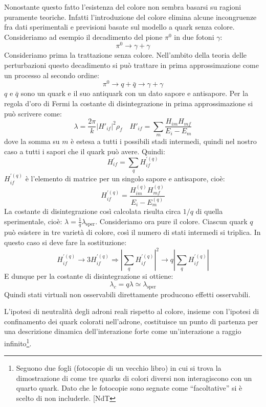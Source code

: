 Nonostante questo fatto l'esistenza del colore non sembra basarsi su ragioni puramente teoriche.
Infatti l'introduzione del colore elimina alcune incongruenze fra dati sperimentali e previsioni basate sul
modello a quark senza colore.
Consideriamo ad esempio il decadimento del pione $\pi^0$ in due fotoni $\gamma$:
\[
\pi^0\rightarrow\gamma+\gamma
\]
Consideriamo prima la trattazione senza colore. Nell'ambito della teoria delle perturbazioni questo decadimento
si può trattare in prima approssimazione come un processo al secondo ordine:
\begin{equation}
\pi^0\rightarrow q+\bar{q}\rightarrow\gamma+\gamma
\end{equation}
$q$ e $\bar{q}$ sono un quark e il suo antiquark con un dato sapore e antisapore. Per la regola d'oro di Fermi la
costante di disintegrazione in prima approssimazione si può scrivere come:
\begin{equation}
\lambda=\frac{2\pi}{k}|H'_{if}|^2\rho_f\quad H'_{if}=\sum_m\frac{H_{im}H_{mf}}{E_i-E_m}
\end{equation}
dove la somma su $m$ è estesa a tutti i possibili stadi intermedi, quindi nel nostro caso a tutti i sapori che
il quark può avere. Quindi:
\[
H_{if}^{'}=\sum_q H_{if}^{'(q)}
\]
$H_{if}^{'(q)}$ è l'elemento di matrice per un singolo sapore e antisapore, cioè:
\[
H_{if}^{'(q)}=\frac{H_{im}^{(q)}H_{mf}^{(q)}}{E_i-E_m^{(q)}}
\]
La costante di disintegrazione così calcolata risulta circa $1/q$ di quella sperimentale,
cioè: $\lambda=\frac{1}{q}\lambda_{\text{sper}}$.
Consideriamo ora pure il colore. Ciascun quark $q$ può esistere in tre varietà di colore, così il numero di
stati intermedi si triplica. In questo caso si deve fare la sostituzione:
\[
H_{if}^{'(q)}\rightarrow 3H_{if}^{'(q)}\Rightarrow |\sum_q H_{if}^{'(q)}|^2\rightarrow q|\sum_q H_{if}^{'(q)}|
\]
E dunque per la costante di disintegrazione si ottiene:
\[
\lambda_c=q\lambda\simeq\lambda_{\text{sper}}
\]
Quindi stati virtuali non osservabili direttamente producono effetti osservabili.

L'ipotesi di neutralità degli adroni reali rispetto al colore, insieme con
l'ipotesi di confinamento dei quark colorati nell'adrone, costituisce un punto
di partenza per una descrizione dinamica dell'interazione forte come
un'interazione a raggio infinito\footnote{Seguono due fogli (fotocopie di un
  vecchio libro) in cui si trova la dimostrazione di come tre quarks di colori
  diversi non interagiscono con un quarto quark. Dato che le fotocopie sono
segnate come ``facoltative'' si è scelto di non includerle. [NdT}.

